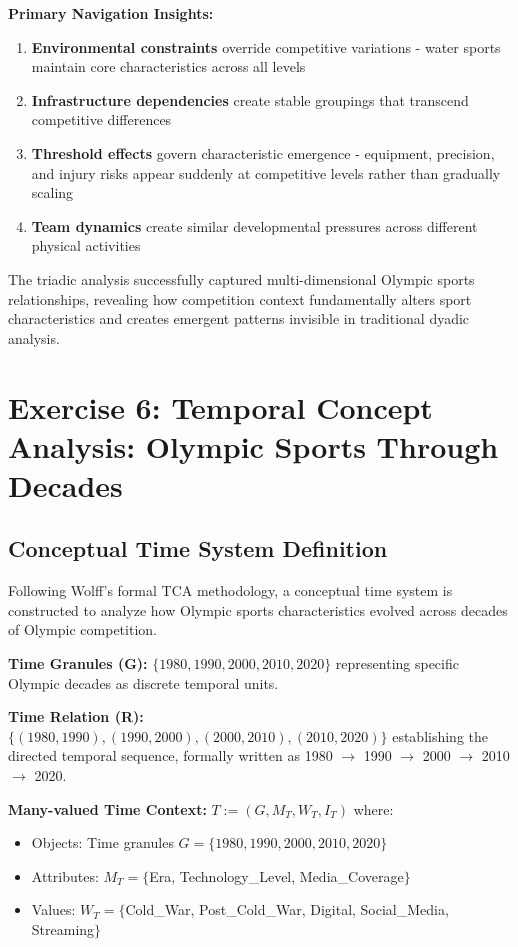 \documentclass{article}
\begin{document}
\textbf{Primary Navigation Insights:}
\begin{enumerate}
    \item \textbf{Environmental constraints} override competitive variations - water sports maintain core characteristics across all levels
    \item \textbf{Infrastructure dependencies} create stable groupings that transcend competitive differences 
    \item \textbf{Threshold effects} govern characteristic emergence - equipment, precision, and injury risks appear suddenly at competitive levels rather than gradually scaling
    \item \textbf{Team dynamics} create similar developmental pressures across different physical activities
\end{enumerate}

The triadic analysis successfully captured multi-dimensional Olympic sports relationships, revealing how competition context fundamentally alters sport characteristics and creates emergent patterns invisible in traditional dyadic analysis.

\newpage
\section*{Exercise 6: Temporal Concept Analysis: Olympic Sports Through Decades}

\subsection*{Conceptual Time System Definition}

Following Wolff's formal TCA methodology, a conceptual time system is constructed to analyze how Olympic sports characteristics evolved across decades of Olympic competition.

\textbf{Time Granules (G):} $\{1980, 1990, 2000, 2010, 2020\}$ representing specific Olympic decades as discrete temporal units.

\textbf{Time Relation (R):} $\{(1980,1990), (1990,2000), (2000,2010), (2010,2020)\}$ establishing the directed temporal sequence, formally written as 1980 $\rightarrow$ 1990 $\rightarrow$ 2000 $\rightarrow$ 2010 $\rightarrow$ 2020.

\textbf{Many-valued Time Context:} $T := (G, M_T, W_T, I_T)$ where:
\begin{itemize}
    \item Objects: Time granules $G = \{1980, 1990, 2000, 2010, 2020\}$
    \item Attributes: $M_T = \{$Era, Technology\_Level, Media\_Coverage$\}$
    \item Values: $W_T = \{$Cold\_War, Post\_Cold\_War, Digital, Social\_Media, Streaming$\}$
\end{itemize}
\end{document}

